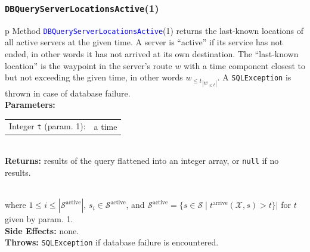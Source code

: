 \documentclass{article}
\theoremstyle{definition}                   %
\begin{document}
\subsubsection{{\tt{}\protect{}DBQueryServerLocationsActive}(1)}
\begin{tabular}{p{\textwidth}}
\toprule
{}
Method \textcolor{blue}{{\tt{}\protect{}DBQueryServerLocationsActive}}(1) returns the
last-known locations of all active servers at the given time. A server is
``active'' if its service has not ended, in other words it has not arrived
at its own destination.
The ``last-known location'' is the waypoint in the server's route $w$
with a time component closest to but not exceeding the given time, in other
words ${w_{\leq t}}_{|w_{\leq t}|}$.
A {\tt{}SQLException} is thrown in case of database failure.\\
\midrule
\textbf{Parameters:} \\
\begin{tabular}{lp{116mm}}
Integer {\tt{}t} (param. 1):&a time
\end{tabular}\\
\textbf{Returns:} results of the query flattened into an integer array, or
{\tt{}null} if no results.

\\

where $1\leq i\leq |\mathcal{S}^\textrm{active}|$,
$s_i\in \mathcal{S}^\textrm{active}$, and
$\mathcal{S}^\textrm{active}= \{s\in\mathcal{S}\mid t^\textrm{arrive}(\mathcal{X},s)>t\}|$
for $t$ given by param. 1.\\
\textbf{Side Effects:} none.\\
\textbf{Throws:} {\tt{}SQLException} if database failure is encountered.\\
\bottomrule
\end{tabular}
\nwenddocs{}\endmoddef{}
\end{document}
